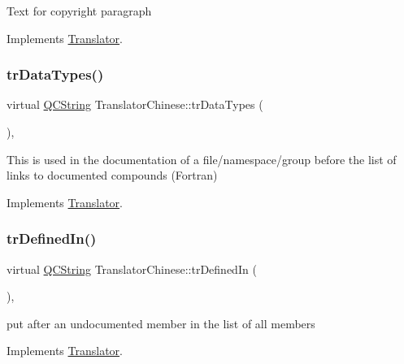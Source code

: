 Text for copyright paragraph 

Implements \mbox{\hyperlink{class_translator}{Translator}}.

\mbox{\label{class_translator_chinese_a6d8814bd6b69896ad0209dd6ba075cf7}} 
\subsubsection{\texorpdfstring{trDataTypes()}{trDataTypes()}}
{\footnotesize\ttfamily virtual \mbox{\hyperlink{class_q_c_string}{Q\+C\+String}} Translator\+Chinese\+::tr\+Data\+Types (\begin{DoxyParamCaption}{ }\end{DoxyParamCaption})\hspace{0.3cm}{\ttfamily [inline]}, {\ttfamily [virtual]}}

This is used in the documentation of a file/namespace/group before the list of links to documented compounds (Fortran) 

Implements \mbox{\hyperlink{class_translator}{Translator}}.

\mbox{\label{class_translator_chinese_ade494df6c8ea640c5348000768f06642}} 
\subsubsection{\texorpdfstring{trDefinedIn()}{trDefinedIn()}}
{\footnotesize\ttfamily virtual \mbox{\hyperlink{class_q_c_string}{Q\+C\+String}} Translator\+Chinese\+::tr\+Defined\+In (\begin{DoxyParamCaption}{ }\end{DoxyParamCaption})\hspace{0.3cm}{\ttfamily [inline]}, {\ttfamily [virtual]}}

put after an undocumented member in the list of all members 

Implements \mbox{\hyperlink{class_translator}{Translator}}.

\mbox{\label{class_translator_chinese_a2b16ef7110e8834820d94724976da3cc}} 

